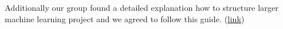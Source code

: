 \documentclass[a4paper,DIV=calc,11pt]{scrartcl}
\begin{document}
Additionally our group found a detailed explanation how to structure larger machine learning project and we agreed to follow this guide. (\href{https://www.jeremyjordan.me/ml-projects-guide/}{link})


\begin{figure}[ht]
\end{figure}
\end{document}
